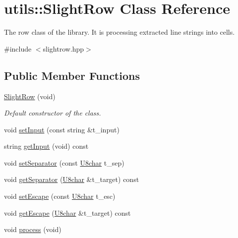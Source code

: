\hypertarget{classutils_1_1SlightRow}{}\section{utils\+:\+:Slight\+Row Class Reference}
\label{classutils_1_1SlightRow}


The row class of the library. It is processing extracted line strings into cells.  




{\ttfamily \#include $<$slightrow.\+hpp$>$}

\subsection*{Public Member Functions}
\begin{DoxyCompactItemize}
\item 
\mbox{\label{classutils_1_1SlightRow_aaf6939d3dbb75448193beef4cc4f1300}} 
\hyperlink{classutils_1_1SlightRow_aaf6939d3dbb75448193beef4cc4f1300}{Slight\+Row} (void)
\begin{DoxyCompactList}\small\item\em Default constructor of the class. \end{DoxyCompactList}\item 
void \hyperlink{classutils_1_1SlightRow_a6642e240662b1d078c9103f867f0adf9}{set\+Input} (const string \&t\+\_\+input)
\item 
string \hyperlink{classutils_1_1SlightRow_a8491ac21fba9e5c258e7c1a3bf3da26a}{get\+Input} (void) const
\item 
void \hyperlink{classutils_1_1SlightRow_a134dbf724d45204294e439733540ba4a}{set\+Separator} (const \hyperlink{classutils_1_1U8char}{U8char} t\+\_\+sep)
\item 
void \hyperlink{classutils_1_1SlightRow_a413f5dbd5873c2226c62907e854b7328}{get\+Separator} (\hyperlink{classutils_1_1U8char}{U8char} \&t\+\_\+target) const
\item 
void \hyperlink{classutils_1_1SlightRow_afab9a3c238d96208e1902da833845e1d}{set\+Escape} (const \hyperlink{classutils_1_1U8char}{U8char} t\+\_\+esc)
\item 
void \hyperlink{classutils_1_1SlightRow_a246b904bb9d00b2fa85d491be12d95e2}{get\+Escape} (\hyperlink{classutils_1_1U8char}{U8char} \&t\+\_\+target) const
\item 
void \hyperlink{classutils_1_1SlightRow_a9774969c2a0276491ab368216c2592a0}{process} (void)

\end{DoxyCompactItemize}
